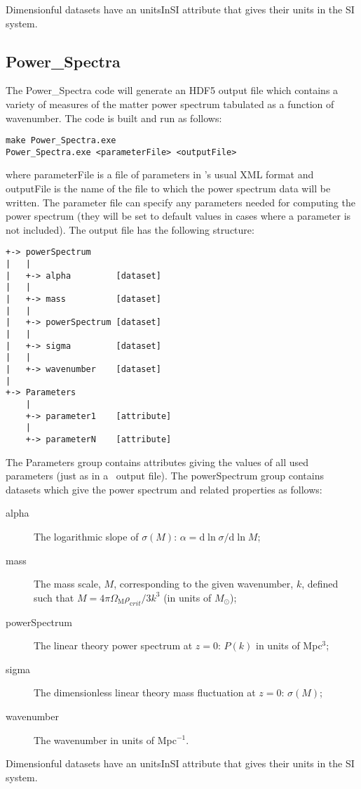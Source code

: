 Dimensionful datasets have an {\normalfont \ttfamily unitsInSI} attribute that gives their units in the SI system.

\subsection{{\normalfont \ttfamily Power\_Spectra}}

The {\normalfont \ttfamily Power\_Spectra} code will generate an HDF5 output file which contains a variety of measures of the matter power spectrum tabulated as a function of wavenumber. The code is built and run as follows:
\begin{verbatim}
make Power_Spectra.exe
Power_Spectra.exe <parameterFile> <outputFile>
\end{verbatim}
where {\normalfont \ttfamily parameterFile} is a file of parameters in \glc's usual XML format and {\normalfont \ttfamily outputFile} is the name of the file to which the power spectrum data will be written. The parameter file can specify any parameters needed for computing the power spectrum (they will be set to default values in cases where a parameter is not included).
The output file has the following structure:
\begin{verbatim}
+-> powerSpectrum
|   |
|   +-> alpha         [dataset]
|   |
|   +-> mass          [dataset]
|   |
|   +-> powerSpectrum [dataset]
|   |
|   +-> sigma         [dataset]
|   |
|   +-> wavenumber    [dataset]
|    
+-> Parameters
    |
    +-> parameter1    [attribute]
    |
    +-> parameterN    [attribute]
\end{verbatim}
The {\normalfont \ttfamily Parameters} group contains attributes giving the values of all used parameters (just as in a \glc\ output file). The {\normalfont \ttfamily powerSpectrum} group contains datasets which give the power spectrum and related properties as follows:
\begin{description}
\item [{\normalfont \ttfamily alpha}] The logarithmic slope of $\sigma(M)$: $\alpha = {\mathrm d} \ln \sigma / {\mathrm d} \ln M$;
\item [{\normalfont \ttfamily mass}] The mass scale, $M$, corresponding to the given wavenumber, $k$, defined such that $M=4 \pi \Omega_{\mathrm M} \rho_{\mathrm crit} / 3 k^3$ (in units of $M_\odot$);
\item [{\normalfont \ttfamily powerSpectrum}] The linear theory power spectrum at $z=0$: $P(k)$ in units of Mpc$^3$;
\item [{\normalfont \ttfamily sigma}] The dimensionless linear theory mass fluctuation at $z=0$: $\sigma(M)$;
\item [{\normalfont \ttfamily wavenumber}] The wavenumber in units of Mpc$^{-1}$.
\end{description}
Dimensionful datasets have an {\normalfont \ttfamily unitsInSI} attribute that gives their units in the SI system.
